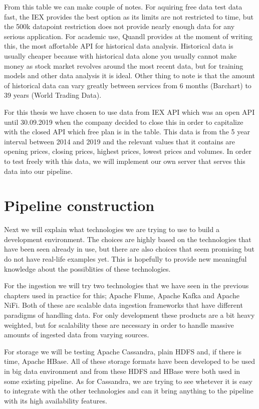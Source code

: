 From this table we can make couple of notes.
For aquiring free data test data fast, the IEX provides the best option as its limits are not restricted to time, but the 500k datapoint restriction does not provide nearly enough data for any serious application.
For academic use, Quandl provides at the moment of writing this, the most affortable API for historical data analysis.
Historical data is usually cheaper because with historical data alone you usually cannot make money as stock market revolves around the most recent data, but for training models and other data analysis it is ideal.
Other thing to note is that the amount of historical data can vary greatly between services from 6 months (Barchart) to 39 years (World Trading Data).

For this thesis we have chosen to use data from IEX API which was an open API until 30.09.2019 when the company decided to close this in order to capitalize with the closed API which free plan is in the table.
This data is from the 5 year interval between 2014 and 2019 and the relevant values that it contains are opening prices, closing prices, highest prices, lowest prices and volumes.
In order to test freely with this data, we will implement our own server that serves this data into our pipeline.

\section{Pipeline construction}

Next we will explain what technologies we are trying to use to build a development environment.
The choices are highly based on the technologies that have been seen already in use, but there are also choices that seem promising but do not have real-life examples yet.
This is hopefully to provide new meaningful knowledge about the possiblities of these technologies.

For the ingestion we will try two technologies that we have seen in the previous chapters used in practice for this; Apache Flume, Apache Kafka and Apache NiFi.
Both of these are scalable data ingestion frameworks that have different paradigms of handling data.
For only development these products are a bit heavy weighted, but for scalability these are necessary in order to handle massive amounts of ingested data from varying sources.

For storage we will be testing Apache Cassandra, plain HDFS and, if there is time, Apache HBase.
All of these storage formats have been developed to be used in big data environment and from these HDFS and HBase were both used in some existing pipeline.
As for Cassandra, we are trying to see whetever it is easy to integrate with the other technologies and can it bring anything to the pipeline with its high availability features.


